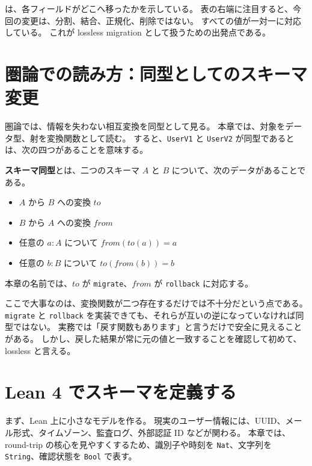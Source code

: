 は、各フィールドがどこへ移ったかを示している。
表の右端に注目すると、今回の変更は、分割、結合、正規化、削除ではない。
すべての値が一対一に対応している。
これが lossless migration として扱うための出発点である。

\section{圏論での読み方：同型としてのスキーマ変更}

圏論では、情報を失わない相互変換を同型として見る。
本章では、対象をデータ型、射を変換関数として読む。
すると、\texttt{UserV1} と \texttt{UserV2} が同型であるとは、次の四つがあることを意味する。

\begin{definitionbox}
\textbf{スキーマ同型}とは、二つのスキーマ \(A\) と \(B\) について、次のデータがあることである。
\begin{itemize}
\item \(A\) から \(B\) への変換 \(\mathit{to}\)
\item \(B\) から \(A\) への変換 \(\mathit{from}\)
\item 任意の \(a : A\) について \(\mathit{from}(\mathit{to}(a)) = a\)
\item 任意の \(b : B\) について \(\mathit{to}(\mathit{from}(b)) = b\)
\end{itemize}
本章の名前では、\(\mathit{to}\) が \texttt{migrate}、\(\mathit{from}\) が \texttt{rollback} に対応する。
\end{definitionbox}


ここで大事なのは、変換関数が二つ存在するだけでは不十分だという点である。
\texttt{migrate} と \texttt{rollback} を実装できても、それらが互いの逆になっていなければ同型ではない。
実務では「戻す関数もあります」と言うだけで安全に見えることがある。
しかし、戻した結果が常に元の値と一致することを確認して初めて、lossless と言える。

\section{Lean 4 でスキーマを定義する}

まず、Lean 上に小さなモデルを作る。
現実のユーザー情報には、UUID、メール形式、タイムゾーン、監査ログ、外部認証 ID などが関わる。
本章では、round-trip の核心を見やすくするため、識別子や時刻を \texttt{Nat}、文字列を \texttt{String}、確認状態を \texttt{Bool} で表す。

